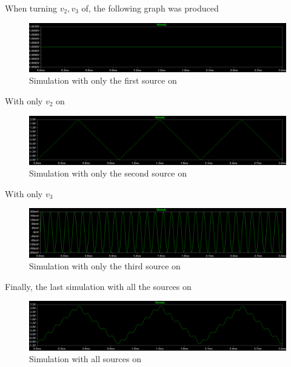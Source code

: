 \documentclass[english,12pt]{article}
\begin{document}
When turning $v_2,v_3$ of, the following graph was produced

\begin{figure}[h]
    \centering
    \includegraphics[scale=0.25]{exp1-v1.png}
    \caption{Simulation with only the first source on}
    \label{fig:10}
\end{figure}

\newpage
With only $v_2$ on

\begin{figure}[h]
    \centering
    \includegraphics[scale=0.25]{exp1-v2.png}
    \caption{Simulation with only the second source on}
    \label{fig:11}
\end{figure}

With only $v_3$

\begin{figure}[h]
    \centering
    \includegraphics[scale=0.25]{exp1-v3.png}
    \caption{Simulation with only the third source on}
    \label{fig:12}
\end{figure}

Finally, the last simulation with all the sources on

\begin{figure}[h]
    \centering
    \includegraphics[scale=0.25]{exp1-all.png}
    \caption{Simulation with all sources on}
    \label{fig:13}
\end{figure}
\end{document}
